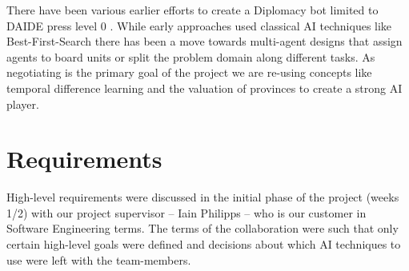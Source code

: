 \documentclass[pdftex,12pt,a4paper]{report}
\begin{document}
There have been various earlier efforts to create a Diplomacy bot
limited to DAIDE press level 0 \cite{DAIDEsyntax10}. While early
approaches used classical AI techniques like Best-First-Search there
has been a move towards multi-agent designs that assign agents to
board units or split the problem domain along different tasks. As
negotiating is the primary goal of the project we are re-using
concepts like temporal difference learning \cite{Levinson94} and the
valuation of provinces \cite{Huff05} to create a strong AI player.


\section{Requirements}
High-level requirements were discussed in the initial phase of the
project (weeks 1/2) with our project supervisor -- Iain Philipps --
who is our customer in Software Engineering terms. The terms of the
collaboration were such that only certain high-level goals were
defined and decisions about which AI techniques to use were left with
the team-members.
\end{document}

